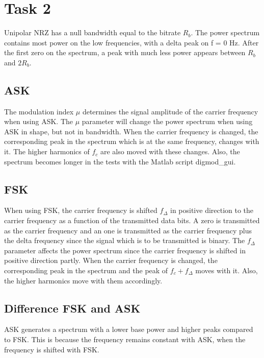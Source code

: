 \documentclass[final]{scrreprt} %
\begin{document}
\section{Task 2}
\label{ch:task2}
Unipolar NRZ has a null bandwidth equal to the bitrate $R_b$. The power spectrum contains most power on the low frequencies, with a delta peak on f = 0 Hz. After the first zero on the spectrum, a peak with much less power appears between $R_b$ and $2 R_b$.

\subsection{ASK}
The modulation index $\mu$ determines the signal amplitude of the carrier frequency when using ASK. The $\mu$ parameter will change the power spectrum when using ASK in shape, but not in bandwidth. When the carrier frequency is changed, the corresponding peak in the spectrum which is at the same frequency, changes with it. The higher harmonics of $f_c$ are also moved with these changes. Also, the spectrum becomes longer in the tests with the Matlab script digmod\_gui.

\subsection{FSK}
When using FSK, the carrier frequency is shifted $f_{\Delta}$ in positive direction to the carrier frequency as a function of the transmitted data bits. A zero is transmitted as the carrier frequency and an one is transmitted as the carrier frequency plus the delta frequency since the signal which is to be transmitted is binary. The $f_{\Delta}$ parameter affects the power spectrum since the carrier frequency is shifted in positive direction partly. When the carrier frequency is changed, the corresponding peak in the spectrum and the peak of $f_c + f_{\Delta}$ moves with it. Also, the higher harmonics move with them accordingly.

\subsection{Difference FSK and ASK}
ASK generates a spectrum with a lower base power and higher peaks compared to FSK. This is because the frequency remains constant with ASK, when the frequency is shifted with FSK.
\end{document}
